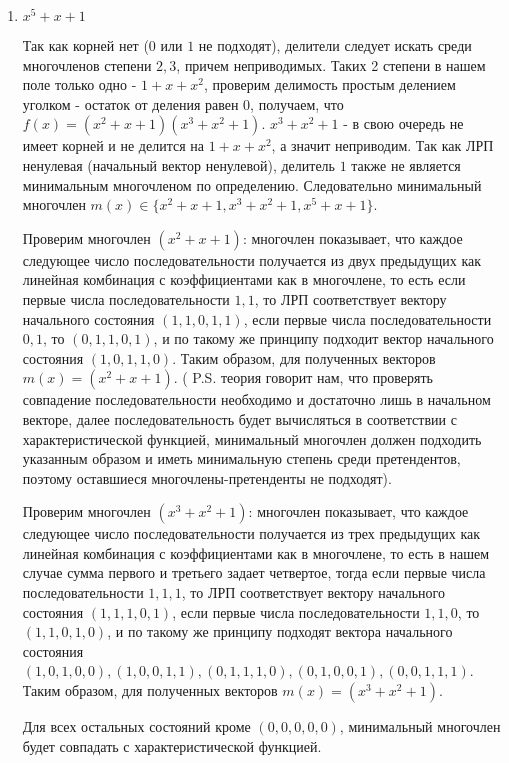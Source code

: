\documentclass[utf8x, 14pt]{G7-32} %
\begin{document}
\begin{enumerate}
    \item $x^5+x+1$ \label{eq1}
    
    Так как корней нет ($0$ или $1$ не подходят), делители следует искать среди многочленов степени $2,3$, причем неприводимых. Таких 2 степени в нашем поле только одно - $1 + x + x^2$, проверим делимость простым делением уголком - остаток от деления равен $0$, получаем, что $f(x) = (x^2+x+1)(x^3+x^2+1)$. $x^3+x^2+1$ - в свою очередь не имеет корней и не делится на $1 + x + x^2$, а значит неприводим. Так как ЛРП ненулевая (начальный вектор ненулевой), делитель $1$ также не является минимальным многочленом по определению. Следовательно минимальный многочлен $m(x)\in \{x^2+x+1, x^3+x^2+1, x^5+x+1\}$.
    
    Проверим многочлен $(x^2+x+1)$:  многочлен показывает, что каждое следующее число последовательности получается из двух предыдущих как линейная комбинация с коэффициентами как в многочлене, то есть если первые числа последовательности $1,1$, то ЛРП соответствует вектору начального состояния $(1, 1, 0, 1, 1)$, если первые числа последовательности $0,1$, то $(0, 1, 1, 0, 1)$, и по такому же принципу подходит вектор начального состояния $(1,0,1,1,0)$. Таким образом, для полученных векторов $m(x) = (x^2+x+1)$.  ( P.S. теория говорит нам, что проверять совпадение последовательности необходимо и достаточно лишь в начальном векторе, далее последовательность будет вычисляться в соответствии с характеристической функцией, минимальный многочлен должен подходить указанным образом и иметь минимальную степень среди претендентов, поэтому оставшиеся многочлены-претенденты не подходят).
    
    Проверим многочлен $(x^3+x^2+1)$:  многочлен показывает, что каждое следующее число последовательности получается из трех предыдущих как линейная комбинация с коэффициентами как в многочлене, то есть в нашем случае сумма первого и третьего задает четвертое, тогда если первые числа последовательности $1,1,1$, то ЛРП соответствует вектору начального состояния $(1, 1, 1, 0, 1)$, если первые числа последовательности $1,1,0$, то $(1, 1, 0, 1, 0)$, и по такому же принципу подходят вектора начального состояния $(1,0,1,0,0), (1,0,0,1,1), (0,1,1,1,0), (0,1,0,0,1), (0,0,1,1,1)$. Таким образом, для полученных векторов $m(x) = (x^3+x^2+1)$.
    
    Для всех остальных состояний кроме $(0,0,0,0,0)$, минимальный многочлен будет совпадать с характеристической функцией.
    

\end{enumerate}
\end{document}

